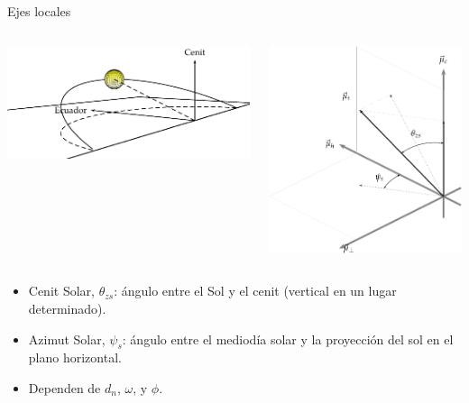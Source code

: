 \documentclass[xcolor={usenames,svgnames,dvipsnames}]{beamer}
\begin{document}
\begin{frame}[plain,label={sec:orgd5ce2cc}]{Ejes locales}
\begin{columns}
\begin{column}{0.6\columnwidth}
\begin{center}
\includegraphics[width=.9\linewidth]{../figs/SoldesdeTierra2.pdf}
\end{center}
\end{column}

\begin{column}{0.6\columnwidth}
\begin{center}
\includegraphics[width=.9\linewidth]{../figs/SistemaCoordenadasLocal-crop.pdf}
\end{center}
\end{column}
\end{columns}

\begin{itemize}
\item \alert{Cenit Solar}, \(\theta_{zs}\): ángulo entre el Sol y el cenit (vertical en un lugar determinado).
\item \alert{Azimut Solar}, \(\psi_s\): ángulo entre el mediodía solar y la proyección del sol en el plano horizontal.
\item Dependen de \(d_n\), \(\omega\), y \(\phi\).
\end{itemize}
\end{frame}
\end{document}
